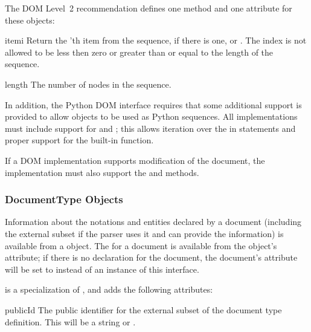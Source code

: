 The DOM Level~2 recommendation defines one method and one attribute
for these objects:

\begin{methoddesc}[NodeList]{item}{i}
  Return the 'th item from the sequence, if there is one, or
  .  The index  is not allowed to be less then zero
  or greater than or equal to the length of the sequence.
\end{methoddesc}

\begin{memberdesc}[NodeList]{length}
  The number of nodes in the sequence.
\end{memberdesc}

In addition, the Python DOM interface requires that some additional
support is provided to allow  objects to be used as
Python sequences.  All  implementations must include
support for  and ; this allows
iteration over the  in  statements and
proper support for the  built-in function.

If a DOM implementation supports modification of the document, the
 implementation must also support the
 and  methods.


\subsubsection{DocumentType Objects \label{dom-documenttype-objects}}

Information about the notations and entities declared by a document
(including the external subset if the parser uses it and can provide
the information) is available from a  object.  The
 for a document is available from the
 object's  attribute; if there is no
 declaration for the document, the document's
 attribute will be set to  instead of an
instance of this interface.

 is a specialization of , and adds the
following attributes:

\begin{memberdesc}[DocumentType]{publicId}
  The public identifier for the external subset of the document type
  definition.  This will be a string or .
\end{memberdesc}

